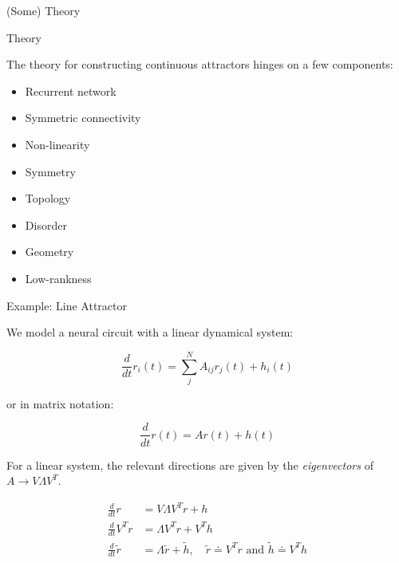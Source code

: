 \documentclass{beamer}
\begin{document}
{
\begin{frame}[plain]
    \centering
    \vfill

    {
    \Huge (Some) Theory\par}

    \vspace{0.8em}


    \vfill
\end{frame}
}


\begin{frame}{Theory}

    The theory for constructing continuous attractors hinges on a few components:

    \begin{itemize}
        \item<1-> Recurrent network
        \item<2-> Symmetric connectivity
        \item<3-> Non-linearity
    \end{itemize}


    \begin{itemize}
        \item<5-> Symmetry
        \item<6-> Topology
        \item<7-> Disorder
        \item<8-> Geometry
        \item<9-> Low-rankness
    \end{itemize}
    
\end{frame}


\begin{frame}{Example: Line Attractor}
    
    We model a neural circuit with a linear dynamical system:

    \begin{equation*}
        \frac{d}{dt} r_i(t) = \sum_j^N A_{ij} r_j(t) + h_i(t)
    \end{equation*}

    or in matrix notation:

    \begin{equation*}
        \frac{d}{dt} r(t) = A r(t) + h(t)
    \end{equation*}

    For a linear system, the relevant directions are given by the \emph{eigenvectors} of $A \rightarrow V \Lambda V^T$. 

    \begin{align*}
        \frac{d}{dt} r     &= V \Lambda V^T r + h\\
        \frac{d}{dt} V^T r &= \Lambda V^T r + V^T h\\
        \frac{d}{dt} \tilde r &= \Lambda \tilde r + \tilde h, \quad \tilde r \doteq V^T r \text{ and } \tilde h \doteq V^T h
    \end{align*}

\end{frame}
\end{document}
